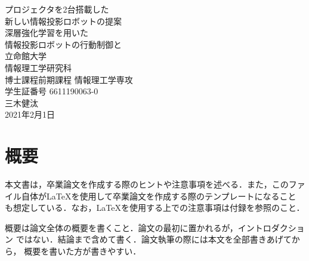 \documentclass[12pt]{sonota/aislab}
\begin{document}

\begin{titlepage}
\centering
\vspace*{3truecm}
\Huge


プロジェクタを2台搭載した\\
新しい情報投影ロボットの提案\\
深層強化学習を用いた\\
情報投影ロボットの行動制御と\\
\vfill
\Large
立命館大学\\
情報理工学研究科\\
博士課程前期課程 情報理工学専攻\\[1zh]
学生証番号 6611190063-0\\[0.5zh]
{\LARGE{三木健汰}}\\[2zh]
2021年2月1日
\end{titlepage}


\let\cleardoublepage\clearpage

\frontmatter

\clearpage
{}
\chapter*{概要}
本文書は，卒業論文を作成する際のヒントや注意事項を述べる．また，このファ
イル自体が{\LaTeX}を使用して卒業論文を作成する際のテンプレートになること
も想定している．なお，{\LaTeX}を使用する上での注意事項は付録を参照のこと．

概要は論文全体の概要を書くこと．論文の最初に置かれるが，イントロダクション
ではない．結論まで含めて書く．論文執筆の際には本文を全部書きあげてから，
概要を書いた方が書きやすい．

\clearpage
{}
\bgroup

\tableofcontents
\clearpage
{}
\listoffigures 
\clearpage
{}
\listoftables
\end{document}
